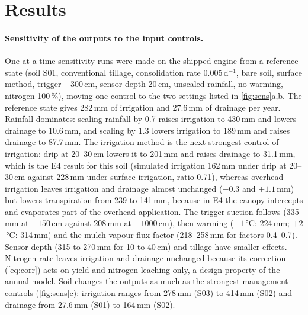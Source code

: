 \section{Results}
\label{sec:results}




\paragraph{Sensitivity of the outputs to the input controls.}
\label{sec:sens}
One-at-a-time sensitivity runs were made on the shipped engine from a reference state (soil S01, conventional tillage, consolidation rate 0.005\,d$^{-1}$, bare soil, surface method, trigger $-300$\,cm, sensor depth 20\,cm, unscaled rainfall, no warming, nitrogen 100\,\%), moving one control to the two settings listed in \cref{fig:sens}a,b. The reference state gives 282\,mm of irrigation and 27.6\,mm of drainage per year. Rainfall dominates: scaling rainfall by 0.7 raises irrigation to 430\,mm and lowers drainage to 10.6\,mm, and scaling by 1.3 lowers irrigation to 189\,mm and raises drainage to 87.7\,mm. The irrigation method is the next strongest control of irrigation: drip at 20--30\,cm lowers it to 201\,mm and raises drainage to 31.1\,mm, which is the E4 result for this soil (simulated irrigation 162\,mm under drip at 20--30\,cm against 228\,mm under surface irrigation, ratio 0.71), whereas overhead irrigation leaves irrigation and drainage almost unchanged ($-0.3$ and $+1.1$\,mm) but lowers transpiration from 239 to 141\,mm, because in E4 the canopy intercepts and evaporates part of the overhead application. The trigger suction follows (335\,mm at $-150$\,cm against 208\,mm at $-1000$\,cm), then warming ($-1$\,°C: 224\,mm; $+2$\,°C: 314\,mm) and the mulch vapour-flux factor (218--258\,mm for factors 0.4--0.7). Sensor depth (315 to 270\,mm for 10 to 40\,cm) and tillage have smaller effects. Nitrogen rate leaves irrigation and drainage unchanged because its correction (\cref{eq:corr}) acts on yield and nitrogen leaching only, a design property of the annual model. Soil changes the outputs as much as the strongest management controls (\cref{fig:sens}c): irrigation ranges from 278\,mm (S03) to 414\,mm (S02) and drainage from 27.6\,mm (S01) to 164\,mm (S02).

